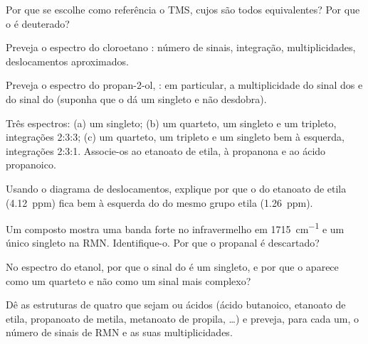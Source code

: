 \begin{exercise}[$\star$]\label{exo:g12:proton-nmr:5}
Por que se escolhe como referência o TMS, cujos  são todos
equivalentes? Por que o  é deuterado?
\end{exercise}

\begin{exercise}[$\star\star$]\label{exo:g12:proton-nmr:6}
Preveja o espectro do cloroetano : número de sinais,
integração, multiplicidades, deslocamentos aproximados.
\end{exercise}

\begin{exercise}[$\star\star$]\label{exo:g12:proton-nmr:7}
Preveja o espectro do propan-2-ol, : em particular, a
multiplicidade do sinal dos  e do sinal do  (suponha que
o  dá um singleto e não desdobra).
\end{exercise}

\begin{exercise}[$\star\star$]\label{exo:g12:proton-nmr:8}
Três espectros: (a) um singleto; (b) um quarteto, um singleto e um
tripleto, integrações 2:3:3; (c) um quarteto, um tripleto e um singleto
bem à esquerda, integrações 2:3:1. Associe-os ao etanoato de etila, à
propanona e ao ácido propanoico.
\end{exercise}

\begin{exercise}[$\star\star$]\label{exo:g12:proton-nmr:9}
Usando o diagrama de deslocamentos, explique por que o  do
etanoato de etila (\qty{4.12}{ppm}) fica bem à esquerda do  do
mesmo grupo etila (\qty{1.26}{ppm}).
\end{exercise}

\begin{exercise}[$\star\star$]\label{exo:g12:proton-nmr:10}
Um composto  mostra uma banda forte no infravermelho em
\qty{1715}{cm^{-1}} e um único singleto na RMN. Identifique-o. Por que o
propanal é descartado?
\end{exercise}

\begin{exercise}[$\star\star$]\label{exo:g12:proton-nmr:11}
No espectro do etanol, por que o sinal do  é um singleto, e por
que o  aparece como um quarteto e não como um sinal mais
complexo?
\end{exercise}

\begin{exercise}[$\star\star\star$]\label{exo:g12:proton-nmr:12}
Dê as estruturas de quatro   que sejam  ou
ácidos (ácido butanoico, etanoato de etila, propanoato de metila,
metanoato de propila, \dots) e preveja, para cada um, o número de sinais
de RMN e as suas multiplicidades.
\end{exercise}

